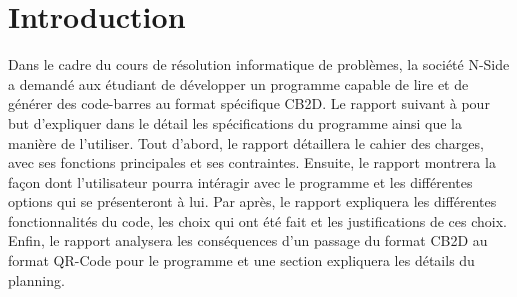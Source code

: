 \newpage
\section*{Introduction}

Dans le cadre du cours de résolution informatique de problèmes, la société N-Side a demandé aux étudiant de développer un programme capable de lire et de générer des code-barres au format spécifique CB2D. Le rapport suivant à pour but d'expliquer dans le détail les spécifications du programme ainsi que la manière de l'utiliser. Tout d'abord, le rapport détaillera le cahier des charges, avec ses fonctions principales et ses contraintes. Ensuite, le rapport montrera la façon dont l'utilisateur pourra intéragir avec le programme et les différentes options qui se présenteront à lui. Par après, le rapport expliquera les différentes fonctionnalités du code, les choix qui ont été fait et les justifications de ces choix. Enfin, le rapport analysera les conséquences d'un passage du format CB2D au format QR-Code pour le programme et une section expliquera les détails du planning. 

